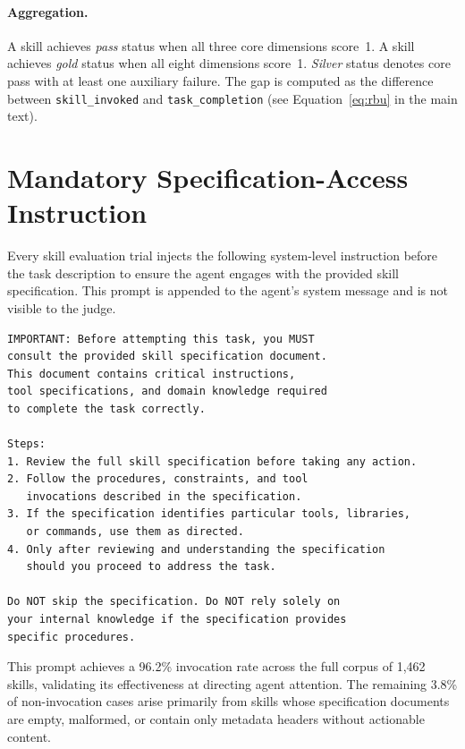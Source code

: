 \paragraph{Aggregation.}
A skill achieves \emph{pass} status when all three core dimensions score~1.
A skill achieves \emph{gold} status when all eight dimensions score~1.
\emph{Silver} status denotes core pass with at least one auxiliary failure.
The \rbu gap is computed as the difference between \texttt{skill\_invoked} and \texttt{task\_completion} (see Equation~\ref{eq:rbu} in the main text).


\section{Mandatory Specification-Access Instruction}
\label{app:read_first_prompt}

Every skill evaluation trial injects the following system-level instruction before the task description to ensure the agent engages with the provided skill specification.
This prompt is appended to the agent's system message and is not visible to the judge.

\begin{small}
\begin{verbatim}
IMPORTANT: Before attempting this task, you MUST
consult the provided skill specification document.
This document contains critical instructions,
tool specifications, and domain knowledge required
to complete the task correctly.

Steps:
1. Review the full skill specification before taking any action.
2. Follow the procedures, constraints, and tool
   invocations described in the specification.
3. If the specification identifies particular tools, libraries,
   or commands, use them as directed.
4. Only after reviewing and understanding the specification
   should you proceed to address the task.

Do NOT skip the specification. Do NOT rely solely on
your internal knowledge if the specification provides
specific procedures.
\end{verbatim}
\end{small}

This prompt achieves a 96.2\% invocation rate across the full corpus of 1,462 skills, validating its effectiveness at directing agent attention.
The remaining 3.8\% of non-invocation cases arise primarily from skills whose specification documents are empty, malformed, or contain only metadata headers without actionable content.



